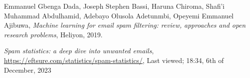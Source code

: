 \documentclass[lettersize,journal]{IEEEtran}
\begin{document}
\begin{thebibliography}{1}
Emmanuel Gbenga Dada, Joseph Stephen Bassi, Haruna Chiroma, Shafi'i Muhammad Abdulhamid, Adebayo Olusola Adetunmbi, Opeyemi Emmanuel Ajibuwa, {\it{Machine learning for email spam filtering: review, approaches and open research problems}}, Heliyon, 2019.


{\it{Spam statistics: a deep dive into unwanted emails}}, \href{https://eftsure.com/statistics/spam-statistics/}{https://eftsure.com/statistics/spam-statistics/}, Last viewed; 18:34, 6th of December, 2023

\end{thebibliography}
\end{document}
